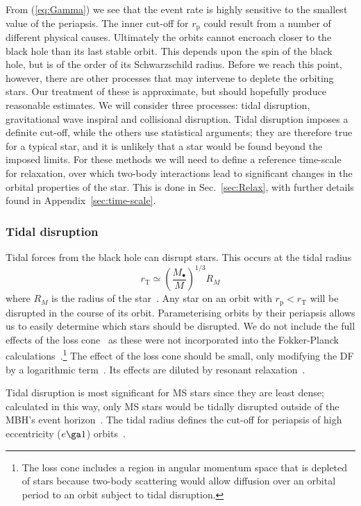 \documentclass[useAMS,usedcolumn,usegraphicx,usenatbib]{mn2e}
\newcommand{\eqnref}[1]{(\ref{eq:#1})}
\newcommand{\secref}[1]{Sec.~\ref{sec:#1}}
\newcommand{\apref}[1]{Appendix~\ref{sec:#1}}
\newcommand{\sub}[1]{\ensuremath{_\mathrm{#1}}}
\begin{document}
From \eqnref{Gamma} we see that the event rate is highly sensitive to the smallest value of the periapsis. The inner cut-off for $r\sub{p}$ could result from a number of different physical causes. Ultimately the orbits cannot encroach closer to the black hole than its last stable orbit. This depends upon the spin of the black hole, but is of the order of its Schwarzschild radius. Before we reach this point, however, there are other processes that may intervene to deplete the orbiting stars. Our treatment of these is approximate, but should hopefully produce reasonable estimates. We will consider three processes: tidal disruption, gravitational wave inspiral and collisional disruption. Tidal disruption imposes a definite cut-off, while the others use statistical arguments; they are therefore true for a typical star, and it is unlikely that a star would be found beyond the imposed limits. For these methods we will need to define a reference time-scale for relaxation, over which two-body interactions lead to significant changes in the orbital properties of the star. This is done in \secref{Relax}, with further details found in \apref{time-scale}.

\subsubsection{Tidal disruption}

Tidal forces from the black hole can disrupt stars. This occurs at the tidal radius
\begin{equation}
r\sub{T} \simeq \left(\frac{M_\bullet}{M}\right)^{1/3}R_M
\label{eq:Tidal}
\end{equation}
where $R_M$ is the radius of the star~\citep{Hills1975, Rees1988, Kobayashi2004}. Any star on an orbit with $r\sub{p} < r\sub{T}$ will be disrupted in the course of its orbit. Parameterising orbits by their periapsis allows us to easily determine which stars should be disrupted. We do not include the full effects of the loss cone~\citep{Frank1976, Lightman1977} as these were not incorporated into the Fokker-Planck calculations~\citep{Hopman2009}.\footnote{The loss cone includes a region in angular momentum space that is depleted of stars because two-body scattering would allow diffusion over an orbital period to an orbit subject to tidal disruption.} The effect of the loss cone should be small, only modifying the DF by a logarithmic term~\citep{Lightman1977, Bahcall1977}. Its effects are diluted by resonant relaxation~\citep{Toonen2009}.

Tidal disruption is most significant for MS stars since they are least dense; calculated in this way, only MS stars would be tidally disrupted outside of the MBH's event horizon~\citep{Sigurdsson1997}. The tidal radius defines the cut-off for periapsis of high eccentricity ($e \ga 1$) orbits~\citep{Lightman1977}.
\end{document}
